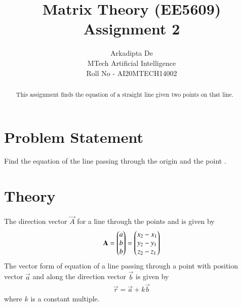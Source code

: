 \documentclass[journal,12pt,twocolumn]{IEEEtran}
\begin{document}
     \def\rightbox#1{\makebox[0in][r]{#1}}
     \def\centbox#1{\makebox[0in]{#1}}
     \def\topbox#1{\raisebox{-\baselineskip}[0in][0in]{#1}}
     \def\midbox#1{\raisebox{-0.5\baselineskip}[0in][0in]{#1}}
\vspace{3cm}
\title{Matrix Theory (EE5609) Assignment 2}
\author{Arkadipta De \\MTech Artificial Intelligence\\Roll No - AI20MTECH14002}
\maketitle
\newpage
\bigskip
\renewcommand{\thetable}{\theenumi}
\begin{abstract}
This assignment finds the equation of a straight line given two points on that line.
\end{abstract}

\section{\textbf{Problem Statement}}Find the equation of the line passing through the origin and the point .

\section{\textbf{Theory}}
The direction vector $\vec{A}$ for a line through the points  and  is given by
\begin{align}\label{eq1}
\mathbf{A}=\begin{pmatrix} a \\ b \\ b \end{pmatrix}=\begin{pmatrix} x_2-x_1 \\ y_2-y_1 \\ z_2-z_1 \end{pmatrix}
\end{align}
The vector form of equation of a line passing through a point with position vector $\vec{a}$ and along the direction vector $\vec{b}$ is given by
\begin{align}\label{eq4}
\vec{r}=\vec{a}+k\vec{b}
\end{align}
where $k$ is a constant multiple.
\end{document}
